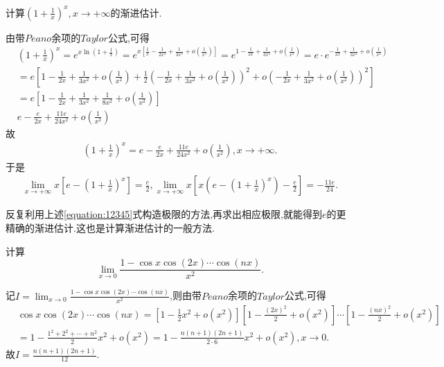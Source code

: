 \documentclass[../../main.tex]{subfiles}
\begin{document}
\begin{example}
计算$(1+\frac{1}{x})^x,x\to+\infty$的渐进估计.
\end{example}
\begin{solution}
由带$Peano$余项的$Taylor$公式,可得
\begin{align*}
&\left( 1+\frac{1}{x} \right) ^x=e^{x\ln \left( 1+\frac{1}{x} \right)}=e^{x\left[ \frac{1}{x}-\frac{1}{2x^2}+\frac{1}{3x^3}+o\left( \frac{1}{x^3} \right) \right]}=e^{1-\frac{1}{2x}+\frac{1}{3x^2}+o\left( \frac{1}{x^2} \right)}=e\cdot e^{-\frac{1}{2x}+\frac{1}{3x^2}+o\left( \frac{1}{x^2} \right)}
\\
&=e\left[ 1-\frac{1}{2x}+\frac{1}{3x^2}+o\left( \frac{1}{x^2} \right) +\frac{1}{2}\left( -\frac{1}{2x}+\frac{1}{3x^2}+o\left( \frac{1}{x^2} \right) \right) ^2+o\left( -\frac{1}{2x}+\frac{1}{3x^2}+o\left( \frac{1}{x^2} \right) \right) ^2 \right] 
\\
&=e\left[ 1-\frac{1}{2x}+\frac{1}{3x^2}+\frac{1}{8x^2}+o\left( \frac{1}{x^2} \right) \right] 
\\
&e-\frac{e}{2x}+\frac{11e}{24x^2}+o\left( \frac{1}{x^2} \right) 
\end{align*}
故\begin{align*}
\left( 1+\frac{1}{x} \right) ^x=e-\frac{e}{2x}+\frac{11e}{24x^2}+o\left( \frac{1}{x^2} \right) ,x\rightarrow +\infty .
\end{align*}
于是
\begin{align}\label{equation:12345}
\underset{x\rightarrow +\infty}{\lim}x\left[ e-\left( 1+\frac{1}{x} \right) ^x \right] =\frac{e}{2},\underset{x\rightarrow +\infty}{\lim}x\left[ x\left( e-\left( 1+\frac{1}{x} \right) ^x \right) -\frac{e}{2} \right] =-\frac{11e}{24}.
\end{align}
\end{solution}
\begin{remark}
反复利用上述\eqref{equation:12345}式构造极限的方法,再求出相应极限,就能得到$e$的更精确的渐进估计.这也是计算渐进估计的一般方法.
\end{remark}

\begin{example}
计算
\[
\lim_{x \to 0} \frac{1 - \cos x \cos(2x) \cdots \cos(nx)}{x^2}.
\]
\end{example}
\begin{solution}
记$I=\lim_{x \to 0} \frac{1 - \cos x \cos(2x) \cdots \cos(nx)}{x^2}$,则由带$Peano$余项的$Taylor$公式,可得
\begin{align*}
&\cos x \cos(2x) \cdots \cos(nx)
=\left[1 - \frac{1}{2}x^2 + o(x^2)\right]\left[1 - \frac{(2x)^2}{2} + o(x^2)\right] \cdots \left[1 - \frac{(nx)^2}{2} + o(x^2)\right]
\\
&= 1 - \frac{1^2 + 2^2 + \cdots + n^2}{2}x^2 + o(x^2)
= 1 - \frac{n(n + 1)(2n + 1)}{2 \cdot 6}x^2 + o(x^2),x\to0.
\end{align*}
故\(I = \frac{n(n + 1)(2n + 1)}{12}\).
\end{solution}
\end{document}
